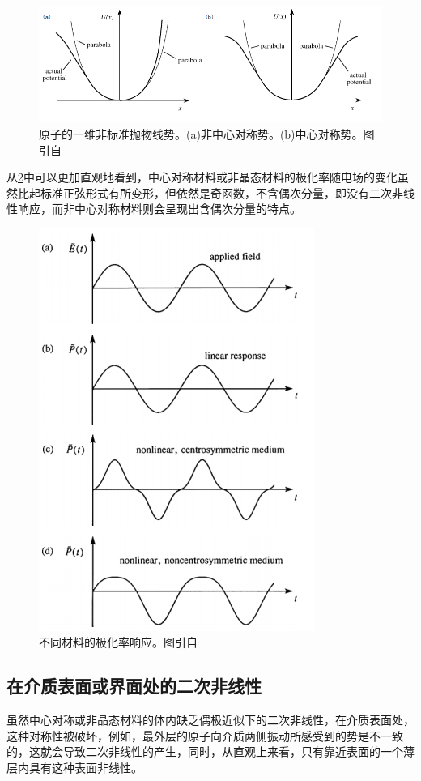 \documentclass[UTF8,a4paper,cs4size,hyperref]{ctexart}
\begin{document}
\begin{figure}
\centering
\includegraphics[scale=0.6 ]{potential.png}
\caption{原子的一维非标准抛物线势。(a)非中心对称势。(b)中心对称势。图引自\cite{boyd2003nonlinear}}
\label{pic:potential}
\end{figure}

从\ref{pic:response}中可以更加直观地看到，中心对称材料或非晶态材料的极化率随电场的变化虽然比起标准正弦形式有所变形，但依然是奇函数，不含偶次分量，即没有二次非线性响应，而非中心对称材料则会呈现出含偶次分量的特点。

\begin{figure}
\centering
\includegraphics[scale=1 ]{response.png}
\caption{不同材料的极化率响应。图引自\cite{boyd2003nonlinear}}
\label{pic:response}
\end{figure}

\subsection{在介质表面或界面处的二次非线性}
虽然中心对称或非晶态材料的体内缺乏偶极近似下的二次非线性，在介质表面处，这种对称性被破坏，例如，最外层的原子向介质两侧振动所感受到的势是不一致的，这就会导致二次非线性的产生，同时，从直观上来看，只有靠近表面的一个薄层内具有这种表面非线性。
\end{document}
